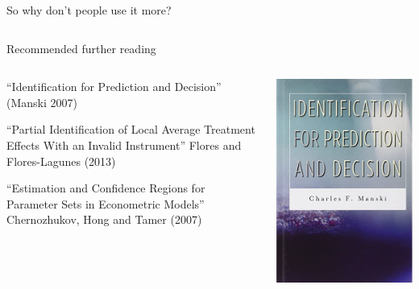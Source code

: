 \documentclass[notes,11pt, aspectratio=169]{beamer}
\newenvironment{wideitemize}{\itemize\addtolength{\itemsep}{10pt}}{\enditemize}
\begin{document}
\begin{frame}{So why don't people use it more?}
\begin{columns}[onlytextwidth, T]
\begin{column}{.5\textwidth}
      \end{column}%
    \end{columns}
\end{frame}

  
\begin{frame}{Recommended further reading}
      \begin{columns}[onlytextwidth, T] %
        \begin{column}{.5\textwidth}
          \begin{wideitemize}
          \item ``Identification for Prediction and Decision'' (Manski 2007)
          \item ``Partial Identification of Local Average Treatment
            Effects With an Invalid Instrument'' Flores and
            Flores-Lagunes (2013)
          \item ``Estimation and Confidence Regions for Parameter Sets
            in Econometric Models'' Chernozhukov, Hong and Tamer
            (2007)
          \end{wideitemize}
      \end{column}%
      \hfill%
      \begin{column}{.5\textwidth}
        \includegraphics[width=\linewidth]{images/manski_book.jpeg}
      \end{column}%
    \end{columns}
\end{frame}
\end{document}
